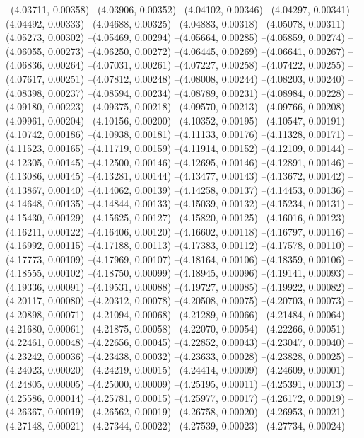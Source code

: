 --(4.03711, 0.00358)
--(4.03906, 0.00352)
--(4.04102, 0.00346)
--(4.04297, 0.00341)
--(4.04492, 0.00333)
--(4.04688, 0.00325)
--(4.04883, 0.00318)
--(4.05078, 0.00311)
--(4.05273, 0.00302)
--(4.05469, 0.00294)
--(4.05664, 0.00285)
--(4.05859, 0.00274)
--(4.06055, 0.00273)
--(4.06250, 0.00272)
--(4.06445, 0.00269)
--(4.06641, 0.00267)
--(4.06836, 0.00264)
--(4.07031, 0.00261)
--(4.07227, 0.00258)
--(4.07422, 0.00255)
--(4.07617, 0.00251)
--(4.07812, 0.00248)
--(4.08008, 0.00244)
--(4.08203, 0.00240)
--(4.08398, 0.00237)
--(4.08594, 0.00234)
--(4.08789, 0.00231)
--(4.08984, 0.00228)
--(4.09180, 0.00223)
--(4.09375, 0.00218)
--(4.09570, 0.00213)
--(4.09766, 0.00208)
--(4.09961, 0.00204)
--(4.10156, 0.00200)
--(4.10352, 0.00195)
--(4.10547, 0.00191)
--(4.10742, 0.00186)
--(4.10938, 0.00181)
--(4.11133, 0.00176)
--(4.11328, 0.00171)
--(4.11523, 0.00165)
--(4.11719, 0.00159)
--(4.11914, 0.00152)
--(4.12109, 0.00144)
--(4.12305, 0.00145)
--(4.12500, 0.00146)
--(4.12695, 0.00146)
--(4.12891, 0.00146)
--(4.13086, 0.00145)
--(4.13281, 0.00144)
--(4.13477, 0.00143)
--(4.13672, 0.00142)
--(4.13867, 0.00140)
--(4.14062, 0.00139)
--(4.14258, 0.00137)
--(4.14453, 0.00136)
--(4.14648, 0.00135)
--(4.14844, 0.00133)
--(4.15039, 0.00132)
--(4.15234, 0.00131)
--(4.15430, 0.00129)
--(4.15625, 0.00127)
--(4.15820, 0.00125)
--(4.16016, 0.00123)
--(4.16211, 0.00122)
--(4.16406, 0.00120)
--(4.16602, 0.00118)
--(4.16797, 0.00116)
--(4.16992, 0.00115)
--(4.17188, 0.00113)
--(4.17383, 0.00112)
--(4.17578, 0.00110)
--(4.17773, 0.00109)
--(4.17969, 0.00107)
--(4.18164, 0.00106)
--(4.18359, 0.00106)
--(4.18555, 0.00102)
--(4.18750, 0.00099)
--(4.18945, 0.00096)
--(4.19141, 0.00093)
--(4.19336, 0.00091)
--(4.19531, 0.00088)
--(4.19727, 0.00085)
--(4.19922, 0.00082)
--(4.20117, 0.00080)
--(4.20312, 0.00078)
--(4.20508, 0.00075)
--(4.20703, 0.00073)
--(4.20898, 0.00071)
--(4.21094, 0.00068)
--(4.21289, 0.00066)
--(4.21484, 0.00064)
--(4.21680, 0.00061)
--(4.21875, 0.00058)
--(4.22070, 0.00054)
--(4.22266, 0.00051)
--(4.22461, 0.00048)
--(4.22656, 0.00045)
--(4.22852, 0.00043)
--(4.23047, 0.00040)
--(4.23242, 0.00036)
--(4.23438, 0.00032)
--(4.23633, 0.00028)
--(4.23828, 0.00025)
--(4.24023, 0.00020)
--(4.24219, 0.00015)
--(4.24414, 0.00009)
--(4.24609, 0.00001)
--(4.24805, 0.00005)
--(4.25000, 0.00009)
--(4.25195, 0.00011)
--(4.25391, 0.00013)
--(4.25586, 0.00014)
--(4.25781, 0.00015)
--(4.25977, 0.00017)
--(4.26172, 0.00019)
--(4.26367, 0.00019)
--(4.26562, 0.00019)
--(4.26758, 0.00020)
--(4.26953, 0.00021)
--(4.27148, 0.00021)
--(4.27344, 0.00022)
--(4.27539, 0.00023)
--(4.27734, 0.00024)
